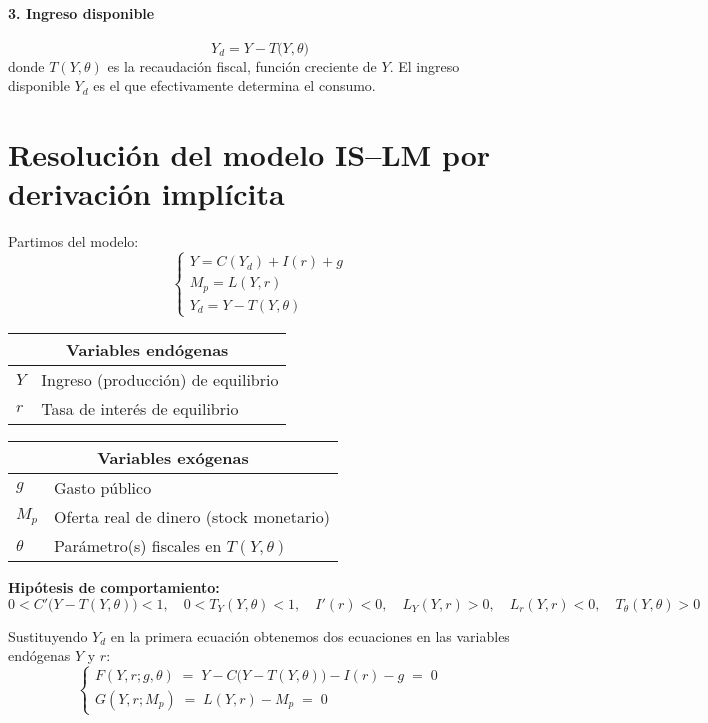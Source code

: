\documentclass{article}
\begin{document}
\bigskip

\paragraph{3. Ingreso disponible}  
\[
Y_d = Y - T\bigl(Y,\theta\bigr)
\]
donde \(T(Y,\theta)\) es la recaudación fiscal, función creciente de \(Y\). El ingreso disponible \(Y_d\) es el que efectivamente determina el consumo.

\bigskip



\section*{Resolución del modelo IS–LM por derivación implícita}


Partimos del modelo:
\[
\begin{cases}
Y = C(Y_d) + I(r) + g\\
M_p = L(Y,r)\\
Y_d = Y - T(Y,\theta)
\end{cases}
\]

\begin{table}[H]
\centering
\begin{tabular}{|l|l|}
\hline
\multicolumn{2}{|c|}{\textbf{\color{teal}Variables endógenas}} \\ \hline
$Y$ & Ingreso (producción) de equilibrio \\ \hline
$r$ & Tasa de interés de equilibrio \\ \hline
\end{tabular}
\quad
\begin{tabular}{|l|l|}
\hline
\multicolumn{2}{|c|}{\textbf{\color{teal}Variables exógenas}} \\ \hline
$g$      & Gasto público \\ \hline
$M_p$    & Oferta real de dinero (stock monetario) \\ \hline
$\theta$ & Parámetro(s) fiscales en $T(Y,\theta)$ \\ \hline
\end{tabular}
\end{table}

\noindent
\textbf{\color{teal}Hipótesis de comportamiento:}
\[
0 < C'\bigl(Y - T(Y,\theta)\bigr) < 1,
\quad
0 < T_Y(Y,\theta) < 1,
\quad
I'(r) < 0,
\quad
L_Y(Y,r) > 0,
\quad
L_r(Y,r) < 0,
\quad
T_\theta(Y,\theta) >0
\]


Sustituyendo \(Y_d\) en la primera ecuación obtenemos dos ecuaciones en las variables endógenas \(Y\) y \(r\):
\[
\begin{cases}
F(Y,r;g,\theta)\;=\;Y - C\bigl(Y - T(Y,\theta)\bigr) - I(r) - g \;=\;0\\[6pt]
G(Y,r;M_p)\;=\;L(Y,r) - M_p \;=\;0
\end{cases}
\]
\end{document}

